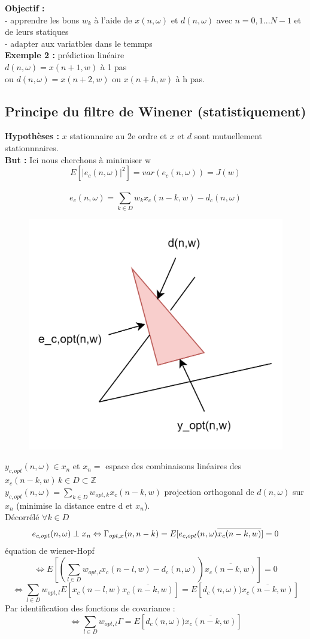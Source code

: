 \documentclass[12pt]{article}
\begin{document}
\textbf{Objectif :} \\
- apprendre les bons $w_k$ à l'aide de $x(n,\omega)$ et $d(n,\omega)$ avec $n=0,1 ...N-1$ et de leurs statiques \\
- adapter aux variatbles dans le temmps\\
\textbf{Exemple 2 :} prédiction linéaire\\
$d(n,\omega) = x(n+1,w)$ à 1 pas\\
ou $d(n,\omega) = x(n+2, w)$ ou $x(n+h,w)$ à h pas.
\newpage

\subsection{Principe du filtre de Winener (statistiquement)}
\textbf{Hypothèses :} $x$ stationnaire au 2e ordre et $x$ et $d$ sont mutuellement stationnnaires. \\
\textbf{But :} Ici nous cherchons à minimiser w  $$E[\lvert e_c(n,\omega)\rvert ^2] = var(e_c(n,\omega)) = J(w)$$\\
$$e_c(n,\omega) = \sum_{k\in D} w_k x_c(n-k,w) - d_c(n,\omega)$$
\begin{figure}[H]
    \centering
    \includegraphics[width=0.5\linewidth]{image2.png}
\end{figure}
$y_{c,opt}(n,\omega) \in x_n$ et $x_n = $ espace des combinaisons linéaires des $x_c(n-k,w) \, k \in D \subset \mathbb{Z}$\\
$y_{c,opt}(n,\omega) = \sum_{k\in D} w_{opt,k} x_c(n-k,w)$ projection orthogonal de $d(n,\omega)$ sur $x_n$ (minimise la distance entre d et $x_n$).\\
Décorrélé $\forall k \in D$
\begin{equation}
    e_{c,opt}(n,\omega) \perp x_n \\
    \Leftrightarrow \Gamma_{opt,x}(n,n-k) = E[e_{c,opt}(n,\omega) \overline{x_c(n-k,w)}] =0   \nonumber
\end{equation}
équation de wiener-Hopf
$$\Leftrightarrow  E[(\sum_{l\in D} w_{opt,l} x_c(n-l, w) -d_c(n,\omega)) \overline{x_c(n-k,w)}]=0$$
$$\Leftrightarrow  \sum_{l\in D} w_{opt,l} E[x_c(n-l, w)\overline{x_c(n-k,w)}] = E[d_c(n,\omega)) \overline{x_c(n-k,w)}]$$
Par identification des fonctions de covariance  : 
$$\Leftrightarrow  \sum_{l\in D} w_{opt,l} \Gamma  = E[d_c(n,\omega)) \overline{x_c(n-k,w)}]$$
\end{document}
